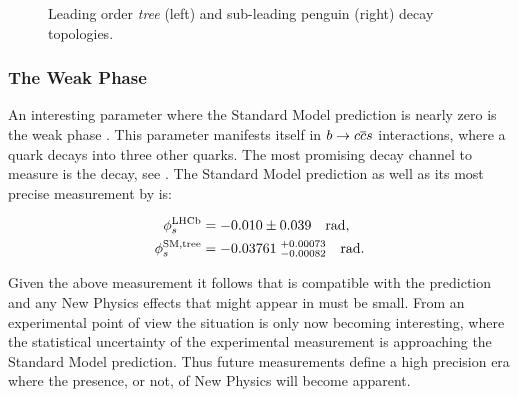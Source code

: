 \begin{figure}[t]
  \begin{subfigure}{0.5\textwidth}
    \raggedright
    {\scalebox{1}{\sffamily }}
    \caption{}
    \label{app_jpsiphi_tree}
  \end{subfigure}%
  \hfill
  \begin{subfigure}{0.5\textwidth}
    \raggedleft
    {\scalebox{1}{\sffamily }}
    \caption{}
    \label{app_jpsiphi_peng}
  \end{subfigure}
    \caption{Leading order {\it tree} (left) and sub-leading penguin (right) \BsJpsiPhi decay topologies.}
  \label{app_jpsiphi_tree_peng}
\end{figure}


\subsubsection{The Weak Phase \phis}

An interesting parameter where the Standard Model prediction is nearly zero is the weak phase \phis.
This parameter manifests itself in $b\rightarrow c\overline {c}s$ interactions, where a \bquark
quark decays into three other quarks. The most promising decay channel to measure \phis is the \BsJpsiPhi
decay, see . The Standard Model \phis prediction as well as its most
precise measurement by \lhcb is:

\begin{subequations}
  \label{app_phis_lhcb_theo}
  \begin{align}
  \centering
  \phiS{\lhcb}           &=  -0.010 \pm 0.039  \quad {\rm rad},
  \label{app_phis_lhcb}\\
  \phiS{SM,tree}  &= -0.03761 \; ^{+0.00073}_{-0.00082}  \quad {\rm rad}.
  \label{app_phis_theo}
\end{align}
\end{subequations}

\noindent Given the above measurement it follows that \phis is compatible
with the prediction and any New Physics effects that might appear in \phis must be small.
From an experimental point of view the situation is only now becoming interesting,
where the statistical uncertainty of the experimental measurement is approaching
the Standard Model prediction. Thus future \phis measurements define a high precision
era where the presence, or not, of New Physics will become apparent.

